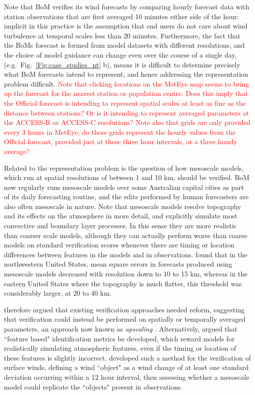\documentclass{ametsoc}
\begin{document}
Note that BoM verifies its wind forecasts by comparing hourly forecast data with station observations that are first averaged 10 minutes either side of the hour: implicit in this practice is the assumption that end users do not care about wind turbulence at temporal scales less than 20 minutes. Furthermore, the fact that the BoMs forecast is formed from model datasets with different resolutions, and the choice of model guidance can change even over the course of a single day, (e.g.~Fig.~\ref{Fig:case_studies_nt} b), means it is difficult to determine precisely what BoM forecasts intend to represent, and hence addressing the representation problem difficult. \textcolor{red}{Note that clicking locations on the MetEye map seems to bring up the forecast for the nearest station or population centre. Does this imply that the Official forecast is intending to represent spatial scales at least as fine as the distance between stations? Or is it intending to represent averaged parameters at the ACCESS-R or ACCESS-C resolutions? Note also that grids are only provided every 3 hours in MetEye; do these grids represent the hourly values from the Official forecast, provided just at these three hour intervals, or a three hourly average?}

Related to the representation problem is the question of how mesoscale models, which run at spatial resolutions of between 1 and 10 km, should be verified. BoM now regularly runs mesoscale models over some Australian capital cities as part of its daily forecasting routine, and the edits performed by human forecasters are also often mesoscale in nature. Note that mesoscale models resolve topography and its effects on the atmosphere in more detail, and explicitly simulate most convective and boundary layer processes. In this sense they are more realistic than coarser scale models, although they can actually perform worse than coarse models on standard verification scores whenever there are timing or location differences between features in the models and in observations. \citet{mass02} found that in the northwestern United States, mean square errors in forecasts produced using mesoscale models decreased with resolution down to 10 to 15 km, whereas in the eastern United States where the topography is much flatter, this threshold was considerably larger, at 20 to 40 km. 

\citet{mass02} therefore argued that existing verification approaches needed reform, suggesting that verification could instead be performed on spatially or temporally averaged parameters, an approach now known as \textit{upscaling} \citep{ebert08}. Alternatively, \citet{mass02} argued that ``feature based" identification metrics be developed, which reward models for realistically simulating atmospheric features, even if the timing or location of these features is slightly incorrect. \citet{rife05} developed such a method for the verification of surface winds, defining a wind ``object" as a wind change of at least one standard deviation occurring within a 12 hour interval, then assessing whether a mesoscale model could replicate the ``objects" present in observations.   
\end{document}

